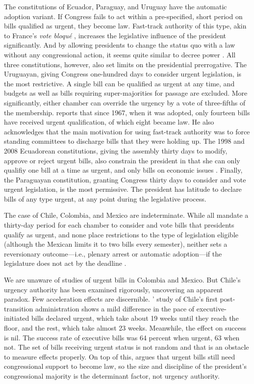\documentclass[letter,12pt]{article}
\begin{document}
The constitutions of Ecuador, Paraguay, and Uruguay have the automatic adoption variant. If Congress fails to act within a pre-specified, short period on bills qualified as urgent, they become law. Fast-track authority of this type, akin to France's \emph{vote bloqué} \citep{huber.1996b}, increases the legislative influence of the president significantly. And by allowing presidents to change the status quo with a law without any congressional action, it seems quite similar to decree power \citep{carey.shugart.1998}. All three constitutions, however, also set limits on the presidential prerrogative. The Uruguayan, giving Congress one-hundred days to consider urgent legislation, is the most restrictive. A single bill can be qualified as urgent at any time, and budgets as well as bills requiring super-majorities for passage are excluded. More significantly, either chamber can override the urgency by a vote of three-fifths of the membership. \citet{chasquetti.2016} reports that since 1967, when it was adopted, only fourteen bills have received urgent qualification, of which eight became law. He also acknowledges that the main motivation for using fast-track authority was to force standing committees to discharge bills that they were holding up. The 1998 and 2008 Ecuadorean constitutions, giving the assembly thirty days to modify, approve or reject urgent bills, also constrain the president in that she can only qualifiy one bill at a time as urgent, and only bills on economic issues \citep{morgenstern-polga-shair.2013}. Finally, the Paraguayan constitution, granting Congress thirty days to consider and vote urgent legislation, is the most permissive. The president has latitude to declare bills of any type urgent, at any point during the legislative process.

The case of Chile, Colombia, and Mexico are indeterminate. While all mandate a thirty-day period for each chamber to consider and vote bills that presidents qualify as urgent, and none place restrictions to the type of legislation eligible (although the Mexican limits it to two bills every semester), neither sets a reversionary outcome---i.e., plenary arrest or automatic adoption---if the legislature does not act by the deadline \citep{nolte.2003,carroll-pachon.2016,magar.2014-refConst}.

We are unaware of studies of urgent bills in Colombia and Mexico. But Chile's urgency authority has been examined rigorously, uncovering an apparent paradox. Few acceleration effects are discernible. \citeauthor{siavelis.2002}' \citeyearpar{siavelis.2002} study of Chile's first post-transition administration shows a mild difference in the pace of executive-initiated bills declared urgent, which take about 19 weeks until they reach the floor, and the rest, which take almost 23 weeks. Meanwhile, the effect on success is nil. The success rate of executive bills was 64 percent when urgent, 63 when not. The set of bills receiving urgent status is not random and that is an obstacle to measure effects properly. On top of this, \citet[][:51]{nolte.2003} argues that urgent bills still need congressional support to become law, so the size and discipline of the president's congressional majority is the determinant factor, not urgency authority. 
\end{document}
